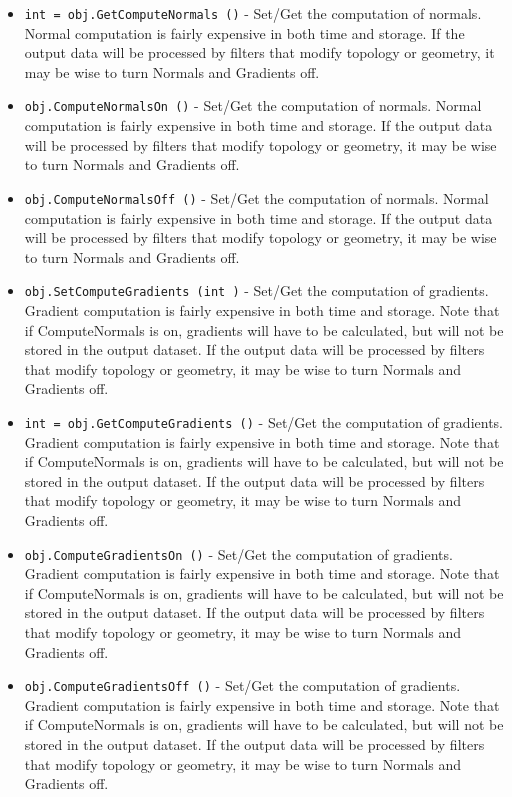 \begin{itemize}
\item  \verb|int = obj.GetComputeNormals ()| -  Set/Get the computation of normals. Normal computation is fairly
 expensive in both time and storage. If the output data will be
 processed by filters that modify topology or geometry, it may be
 wise to turn Normals and Gradients off.

\item  \verb|obj.ComputeNormalsOn ()| -  Set/Get the computation of normals. Normal computation is fairly
 expensive in both time and storage. If the output data will be
 processed by filters that modify topology or geometry, it may be
 wise to turn Normals and Gradients off.

\item  \verb|obj.ComputeNormalsOff ()| -  Set/Get the computation of normals. Normal computation is fairly
 expensive in both time and storage. If the output data will be
 processed by filters that modify topology or geometry, it may be
 wise to turn Normals and Gradients off.

\item  \verb|obj.SetComputeGradients (int )| -  Set/Get the computation of gradients. Gradient computation is
 fairly expensive in both time and storage. Note that if
 ComputeNormals is on, gradients will have to be calculated, but
 will not be stored in the output dataset.  If the output data
 will be processed by filters that modify topology or geometry, it
 may be wise to turn Normals and Gradients off.

\item  \verb|int = obj.GetComputeGradients ()| -  Set/Get the computation of gradients. Gradient computation is
 fairly expensive in both time and storage. Note that if
 ComputeNormals is on, gradients will have to be calculated, but
 will not be stored in the output dataset.  If the output data
 will be processed by filters that modify topology or geometry, it
 may be wise to turn Normals and Gradients off.

\item  \verb|obj.ComputeGradientsOn ()| -  Set/Get the computation of gradients. Gradient computation is
 fairly expensive in both time and storage. Note that if
 ComputeNormals is on, gradients will have to be calculated, but
 will not be stored in the output dataset.  If the output data
 will be processed by filters that modify topology or geometry, it
 may be wise to turn Normals and Gradients off.

\item  \verb|obj.ComputeGradientsOff ()| -  Set/Get the computation of gradients. Gradient computation is
 fairly expensive in both time and storage. Note that if
 ComputeNormals is on, gradients will have to be calculated, but
 will not be stored in the output dataset.  If the output data
 will be processed by filters that modify topology or geometry, it
 may be wise to turn Normals and Gradients off.


\end{itemize}
